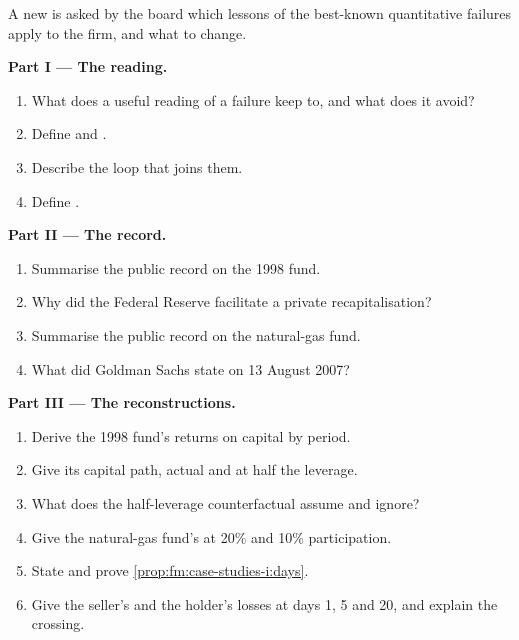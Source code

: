 \begin{problem}\label{pb:fm:case-studies-i:1}
A new  is asked by the board which lessons of the best-known quantitative failures apply to the firm, and what to change.

\medskip\noindent\textbf{Part I --- The reading.}
\begin{enumerate}
\item What does a useful reading of a failure keep to, and what does it avoid?
\item Define  and .
\item Describe the loop that joins them.
\item Define .
\end{enumerate}

\medskip\noindent\textbf{Part II --- The record.}
\begin{enumerate}[resume]
\item Summarise the public record on the 1998 fund.
\item Why did the Federal Reserve facilitate a private recapitalisation?
\item Summarise the public record on the natural-gas fund.
\item What did Goldman Sachs state on 13 August 2007?
\end{enumerate}

\medskip\noindent\textbf{Part III --- The reconstructions.}
\begin{enumerate}[resume]
\item Derive the 1998 fund's returns on capital by period.
\item Give its capital path, actual and at half the leverage.
\item What does the half-leverage counterfactual assume and ignore?
\item Give the natural-gas fund's  at 20\% and 10\% participation.
\item State and prove \cref{prop:fm:case-studies-i:days}.
\item Give the seller's and the holder's losses at days 1, 5 and 20, and explain the crossing.
\end{enumerate}


\end{problem}
